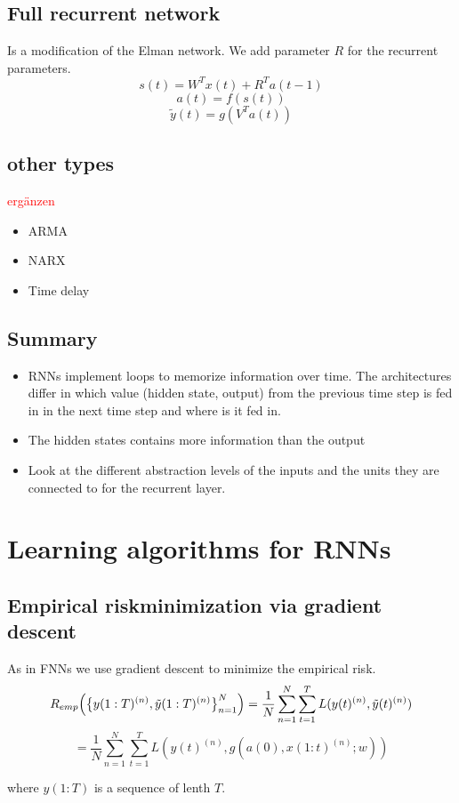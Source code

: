 \documentclass[10pt,a4paper]{article}
\numberwithin{equation}{section}
\begin{document}
\subsection{Full recurrent network}
Is a modification of the Elman network. We add parameter $R$ for the recurrent parameters.
\[ s(t) = W^T x(t) + R^T a(t-1) \]
\[ a(t) = f(s(t)) \]
\[ \tilde{y}(t) = g(V^T a(t)) \]

\subsection{other types}
\textcolor{red}{ergänzen}
\begin{itemize}
\item ARMA
\item NARX
\item Time delay
\end{itemize}

\subsection{Summary}
\begin{itemize}
\item RNNs implement loops to memorize information over time. The architectures differ in which value (hidden state, output) from the previous time step is fed in in the next time step and where is it fed in.
\item The hidden states contains more information than the output
\item Look at the different abstraction levels of the inputs and the units they are connected to for the recurrent layer.
\end{itemize}

\section{Learning algorithms for RNNs}
\subsection{Empirical riskminimization via gradient descent}
As in FNNs we use gradient descent to minimize the empirical risk.
\[ R_{emp}\Bigl( \bigl\{ y(1:T)^{(n)}, \tilde{y}(1:T)^{(n)} \bigr\}_{n=1}^N  \Bigr) = 
\frac{1}{N} \sum_{n=1}^N \sum_{t=1}^T L(y(t)^{(n)},\tilde{y}(t)^{(n)} ) \]
\[ = \frac{1}{N} \sum_{n=1}^N \sum_{t=1}^T L(y(t)^{(n)},g(a(0),x(1:t)^{(n)};w) ) \]

where $y(1:T)$ is a sequence of lenth $T$. 
\end{document}

